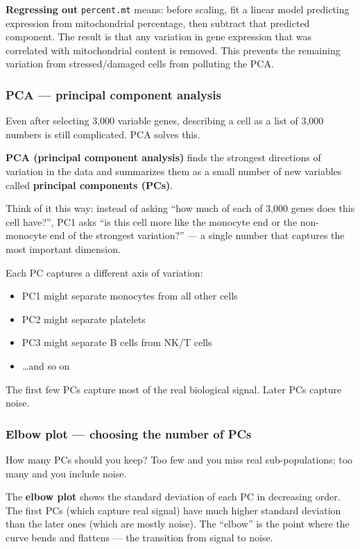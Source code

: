 \documentclass[11pt, a4paper]{article}
\begin{document}
\textbf{Regressing out} \texttt{percent.mt} means: before scaling, fit a linear model
predicting expression from mitochondrial percentage, then subtract that predicted
component. The result is that any variation in gene expression that was correlated
with mitochondrial content is removed. This prevents the remaining variation from
stressed/damaged cells from polluting the PCA.

\subsubsection{PCA — principal component analysis}

Even after selecting 3,000 variable genes, describing a cell as a list of 3,000
numbers is still complicated. PCA solves this.

\textbf{PCA (principal component analysis)} finds the strongest directions of
variation in the data and summarizes them as a small number of new variables
called \textbf{principal components (PCs)}.

Think of it this way: instead of asking ``how much of each of 3,000 genes does
this cell have?'', PC1 asks ``is this cell more like the monocyte end or the
non-monocyte end of the strongest variation?'' — a single number that captures
the most important dimension.

Each PC captures a different axis of variation:
\begin{itemize}[nosep]
  \item PC1 might separate monocytes from all other cells
  \item PC2 might separate platelets
  \item PC3 might separate B cells from NK/T cells
  \item \ldots and so on
\end{itemize}

The first few PCs capture most of the real biological signal.
Later PCs capture noise.

\subsubsection{Elbow plot — choosing the number of PCs}

How many PCs should you keep?
Too few and you miss real sub-populations; too many and you include noise.

The \textbf{elbow plot} shows the standard deviation of each PC in decreasing order.
The first PCs (which capture real signal) have much higher standard deviation
than the later ones (which are mostly noise).
The ``elbow'' is the point where the curve bends and flattens — the transition
from signal to noise.
\end{document}
